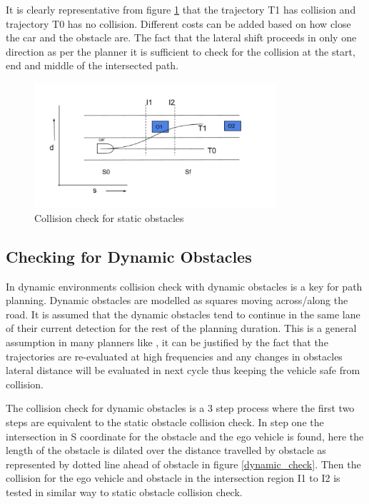 It is clearly representative from figure \ref{static_check} that the trajectory T1 has collision and trajectory T0 has no collision. Different costs can be added based on how close the car and the obstacle are. The fact that the lateral shift proceeds in only one direction as per the planner it is sufficient to check for the collision at the start, end and middle of the intersected path. 


 \begin{figure}[H]
    \centering
    \includegraphics[width=0.8\textwidth]{Images/static_check.png}
    \caption{Collision check for static obstacles}
    \label{static_check}
\end{figure}



\subsection{Checking for Dynamic Obstacles} \label{obstacle_check_dynamic}

In dynamic environments collision check with dynamic obstacles is a key for path planning. Dynamic obstacles are modelled as squares moving across/along the road. It is assumed that the dynamic obstacles tend to continue in the same lane of their current detection for the rest of the planning duration. This is a general assumption in many planners like \cite{unit_A_star}, it can be justified by the fact that the trajectories are re-evaluated at high frequencies and any changes in obstacles lateral distance will be evaluated in next cycle thus keeping the vehicle safe from collision. 

The collision check for dynamic obstacles is a 3 step process where the first two steps are equivalent to the static obstacle collision check. In step one the intersection in S coordinate for the obstacle and the ego vehicle is found, here the length of the obstacle is dilated over the distance travelled by obstacle as represented by dotted line ahead of obstacle in figure \ref{dynamic_check}. Then the collision for the ego vehicle and obstacle in the intersection region I1 to I2 is tested in similar way to static obstacle collision check. 

